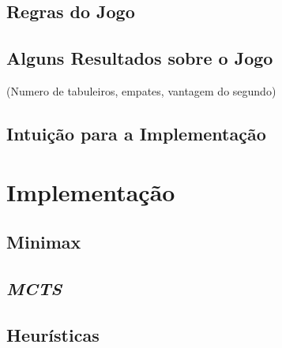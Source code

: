 \documentclass[12pt,a4paper,oneside]{article}
\begin{document}
\subsection{Regras do Jogo}

\lipsum[1]

\lipsum[2]

\lipsum[3]

\subsection{Alguns Resultados sobre o Jogo}

(Numero de tabuleiros, empates, vantagem do segundo)

\lipsum[1]

\lipsum[2]

\subsection{Intuição para a Implementação}

\lipsum[1]

\lipsum[2]


\section{Implementação}
\label{sec:imp}

\lipsum[1]

\subsection{Minimax}

\lipsum[1]

\lipsum[2]

\subsection{\textit{MCTS}}

\lipsum[1]

\lipsum[2]

\lipsum[3]

\subsection{Heurísticas}
\end{document}
